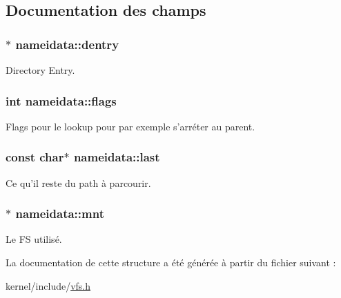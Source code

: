 \subsection{Documentation des champs}
\hypertarget{structnameidata_a19b1de01d7a6f689707fa7079cb54d7c}{
\subsubsection[{dentry}]{$\ast$ nameidata\+::dentry}}\label{structnameidata_a19b1de01d7a6f689707fa7079cb54d7c}
Directory Entry. \hypertarget{structnameidata_a9064ec2b4dd712691e3c7442e48ce798}{
\subsubsection[{flags}]{\setlength{\rightskip}{0pt plus 5cm}int nameidata\+::flags}}\label{structnameidata_a9064ec2b4dd712691e3c7442e48ce798}
Flags pour le lookup pour par exemple s'arréter au parent. \hypertarget{structnameidata_a4a11e098a53839c36c2a0a4e732f8037}{
\subsubsection[{last}]{\setlength{\rightskip}{0pt plus 5cm}const char$\ast$ nameidata\+::last}}\label{structnameidata_a4a11e098a53839c36c2a0a4e732f8037}
Ce qu'il reste du path à parcourir. \hypertarget{structnameidata_a5488ed23ef4b37b431921f71b15e1f19}{
\subsubsection[{mnt}]{$\ast$ nameidata\+::mnt}}\label{structnameidata_a5488ed23ef4b37b431921f71b15e1f19}
Le F\+S utilisé. 

La documentation de cette structure a été générée à partir du fichier suivant \+:\begin{DoxyCompactItemize}
\item 
kernel/include/\hyperlink{vfs_8h}{vfs.\+h}\end{DoxyCompactItemize}

